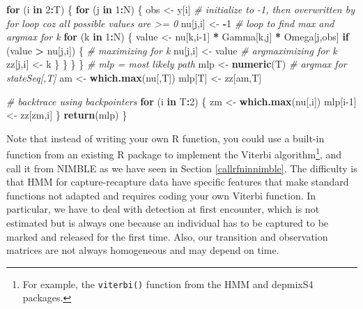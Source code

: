 \documentclass[
  12pt,
]{krantz}
\newenvironment{Shaded}{\begin{snugshade}}{\end{snugshade}}
\newcommand{\CommentTok}[1]{\textcolor[rgb]{0.56,0.35,0.01}{\textit{#1}}}
\newcommand{\ControlFlowTok}[1]{\textcolor[rgb]{0.13,0.29,0.53}{\textbf{#1}}}
\newcommand{\DecValTok}[1]{\textcolor[rgb]{0.00,0.00,0.81}{#1}}
\newcommand{\FunctionTok}[1]{\textcolor[rgb]{0.13,0.29,0.53}{\textbf{#1}}}
\newcommand{\NormalTok}[1]{#1}
\newcommand{\OtherTok}[1]{\textcolor[rgb]{0.56,0.35,0.01}{#1}}
\newcommand{\SpecialCharTok}[1]{\textcolor[rgb]{0.81,0.36,0.00}{\textbf{#1}}}
\begin{document}
\begin{Shaded}
\begin{Highlighting}[]
\ControlFlowTok{for}\NormalTok{ (i }\ControlFlowTok{in} \DecValTok{2}\SpecialCharTok{:}\NormalTok{T) \{}
    \ControlFlowTok{for}\NormalTok{ (j }\ControlFlowTok{in} \DecValTok{1}\SpecialCharTok{:}\NormalTok{N) \{}
\NormalTok{      obs }\OtherTok{\textless{}{-}}\NormalTok{ y[i]}
      \CommentTok{\# initialize to {-}1, then overwritten by for loop coz all possible values are \textgreater{}= 0}
\NormalTok{      nu[j,i] }\OtherTok{\textless{}{-}} \SpecialCharTok{{-}}\DecValTok{1}
      \CommentTok{\# loop to find max and argmax for k}
      \ControlFlowTok{for}\NormalTok{ (k }\ControlFlowTok{in} \DecValTok{1}\SpecialCharTok{:}\NormalTok{N) \{}
\NormalTok{        value }\OtherTok{\textless{}{-}}\NormalTok{ nu[k,i}\DecValTok{{-}1}\NormalTok{] }\SpecialCharTok{*}\NormalTok{ Gamma[k,j] }\SpecialCharTok{*}\NormalTok{ Omega[j,obs]}
        \ControlFlowTok{if}\NormalTok{ (value }\SpecialCharTok{\textgreater{}}\NormalTok{ nu[j,i]) \{}
          \CommentTok{\# maximizing for k}
\NormalTok{          nu[j,i] }\OtherTok{\textless{}{-}}\NormalTok{ value}
          \CommentTok{\# argmaximizing for k}
\NormalTok{          zz[j,i] }\OtherTok{\textless{}{-}}\NormalTok{ k}
\NormalTok{        \}}
\NormalTok{      \}}
\NormalTok{    \}}
\NormalTok{  \}}
  \CommentTok{\# mlp = most likely path}
\NormalTok{  mlp }\OtherTok{\textless{}{-}} \FunctionTok{numeric}\NormalTok{(T)}
  \CommentTok{\# argmax for stateSeq[,T]}
\NormalTok{  am }\OtherTok{\textless{}{-}} \FunctionTok{which.max}\NormalTok{(nu[,T])}
\NormalTok{  mlp[T] }\OtherTok{\textless{}{-}}\NormalTok{ zz[am,T]}
  
  \CommentTok{\# backtrace using backpointers}
  \ControlFlowTok{for}\NormalTok{ (i }\ControlFlowTok{in}\NormalTok{ T}\SpecialCharTok{:}\DecValTok{2}\NormalTok{) \{}
\NormalTok{    zm }\OtherTok{\textless{}{-}} \FunctionTok{which.max}\NormalTok{(nu[,i])}
\NormalTok{    mlp[i}\DecValTok{{-}1}\NormalTok{] }\OtherTok{\textless{}{-}}\NormalTok{ zz[zm,i]}
\NormalTok{  \}}
  \FunctionTok{return}\NormalTok{(mlp)}
\NormalTok{\}}
\end{Highlighting}
\end{Shaded}

Note that instead of writing your own R function, you could use a built-in function from an existing R package to implement the Viterbi algorithm\footnote{For example, the \texttt{viterbi()} function from the HMM and depmixS4 packages.}, and call it from NIMBLE as we have seen in Section \ref{callrfninnimble}. The difficulty is that HMM for capture-recapture data have specific features that make standard functions not adapted and requires coding your own Viterbi function. In particular, we have to deal with detection at first encounter, which is not estimated but is always one because an individual has to be captured to be marked and released for the first time. Also, our transition and observation matrices are not always homogeneous and may depend on time.
\end{document}
